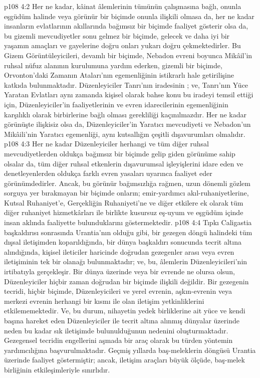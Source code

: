 \vs p108 4:2 Her ne kadar, kâinat âlemlerinin tümünün çalışmasına bağlı, onunla eşgüdüm halinde veya görünür bir biçimde onunla ilişkili olmasa da, her ne kadar insanların evlatlarının akıllarında bağımsız bir biçimde faaliyet gösterir olsa da, bu gizemli mevcudiyetler sonu gelmez bir biçimde, gelecek ve daha iyi bir yaşamın amaçları ve gayelerine doğru onları yukarı doğru çekmektedirler. Bu Gizem Görüntüleyicileri, devamlı bir biçimde, Nebadon evreni boyunca Mikâil’in ruhsal nüfuz alanının kurulumuna yardım ederken, gizemli bir biçimde, Orvonton’daki Zamanın Ataları’nın egemenliğinin istikrarlı hale getirilişine katkıda bulunmaktadır. Düzenleyiciler Tanrı’nın iradesinin ; ve, Tanrı’nın Yüce Yaratan Evlatları aynı zamanda kişisel olarak bahse konu bu iradeyi temsil ettiği için, Düzenleyiciler’in faaliyetlerinin ve evren idarecilerinin egemenliğinin karşılıklı olarak birbirlerine bağlı olması gerekliliği kaçınılmazdır. Her ne kadar görünüşte ilişkisiz olsa da, Düzenleyiciler’in Yaratıcı mevcudiyeti ve Nebadon’un Mikâili’nin Yaratıcı egemenliği, aynı kutsallığın çeşitli dışavurumları olmalıdır.
\vs p108 4:3 Her ne kadar Düzenleyiciler herhangi ve tüm diğer ruhsal mevcudiyetlerden oldukça bağımsız bir biçimde gelip giden görünüme sahip olsalar da, tüm diğer ruhsal etkenlerin dışavurumsal işleyişlerini idare eden ve denetleyenlerden oldukça farklı evren yasaları uyarınca faaliyet eder görünümdedirler. Ancak, bu görünür bağımsızlığa rağmen, uzun dönemli gözlem sorguya yer bırakmayan bir biçimde onların; emir\hyp{}yardımcı akıl\hyp{}ruhaniyetlerine, Kutsal Ruhaniyet’e, Gerçekliğin Ruhaniyeti’ne ve diğer etkilere ek olarak tüm diğer ruhaniyet hizmetkârları ile birlikte kusursuz eş\hyp{}uyum ve eşgüdüm içinde insan aklında faaliyette bulunduklarını göstermektedir.
\vs p108 4:4 Tıpkı Caligastia başkaldırısı sonrasında Urantia’nın olduğu gibi, bir gezegen döngü halindeki tüm dışsal iletişimden koparıldığında, bir dünya başkaldırı sonucunda tecrit altına alındığında, kişisel ileticiler haricinde doğrudan gezegenler arası veya evren iletişiminin tek bir olanağı bulunmaktadır; ve, bu, âlemlerin Düzenleyicileri’nin irtibatıyla gerçekleşir. Bir dünya üzerinde veya bir evrende ne olursa olsun, Düzenleyiciler hiçbir zaman doğrudan bir biçimde ilişkili değildir. Bir gezegenin tecridi, hiçbir biçimde, Düzenleyicileri ve yerel evrenin, aşkın\hyp{}evrenin veya merkezi evrenin herhangi bir kısmı ile olan iletişim yetkinliklerini etkilememektedir. Ve, bu durum, nihayetin yedek birliklerine ait yüce ve kendi başına hareket eden Düzenleyiciler ile tecrit altına alınmış dünyalar üzerinde neden bu kadar sık iletişimde bulunulduğunun nedenini oluşturmaktadır. Gezegensel tecridin engellerini aşmada bir araç olarak bu türden yöntemin yardımcılığına başvurulmaktadır. Geçmiş yıllarda baş\hyp{}meleklerin döngüsü Urantia üzerinde faaliyet göstermiştir; ancak, iletişim araçları büyük ölçüde, baş\hyp{}melek birliğinin etkileşimleriyle sınırlıdır.
